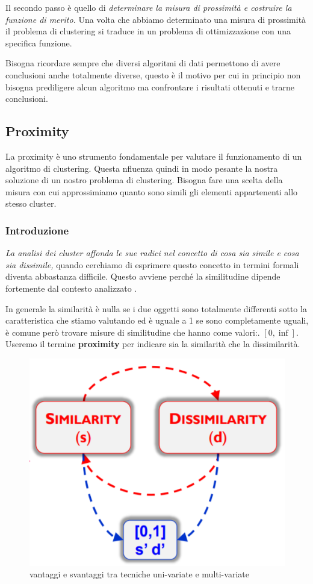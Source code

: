 Il secondo passo è quello di \textit{determinare la misura di prossimità e costruire la funzione di merito.} Una volta che abbiamo determinato una misura di prossimità il problema di clustering si traduce in un problema di ottimizzazione con una specifica funzione.

Bisogna ricordare sempre che diversi algoritmi di dati permettono di avere conclusioni anche totalmente diverse, questo è il motivo per cui in principio non bisogna prediligere alcun algoritmo ma confrontare i risultati ottenuti e trarne conclusioni.


\subsection{ Proximity}

La proximity è uno strumento fondamentale per valutare il funzionamento di un algoritmo di clustering. Questa nfluenza quindi in modo pesante la nostra soluzione di un nostro problema di clustering. Bisogna fare una scelta della misura con cui approssimiamo quanto sono simili gli elementi appartenenti allo stesso cluster.
\subsubsection{Introduzione}
\textit{La analisi dei cluster affonda le sue radici nel concetto di cosa sia simile e cosa sia dissimile,} quando cerchiamo di esprimere questo concetto  in termini formali diventa abbastanza difficile. Questo avviene perché la similitudine dipende fortemente dal contesto analizzato .

In generale la similarità è nulla se i due oggetti sono totalmente differenti sotto la caratteristica che stiamo valutando ed è uguale a 1 se sono completamente uguali, è comune però trovare misure di similitudine che hanno come valori:.  $[0,\inf]$. Useremo il termine \textbf{proximity} per indicare sia la similarità che la dissimilarità. 

\begin{figure}[H]
	\centering
	\includegraphics[height=0.45 \linewidth]{clustering/pict/simil_diss.png}
	\caption{vantaggi e svantaggi tra tecniche uni-variate e multi-variate}
\end{figure}

